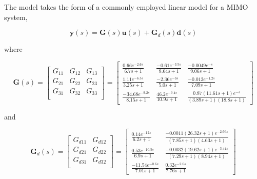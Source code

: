 \documentclass[a4paper,12pt]{article}
\begin{document}
The model takes the form of a commonly employed linear model for a MIMO system,

\begin{equation}
\textbf{y}(s) = \textbf{G}(s)\textbf{u}(s) + \textbf{G}_{d}(s)\textbf{d}(s)
\end{equation}

where

\begin{equation}
	\textbf{G}(s) = \begin{bmatrix}
	G_{11} & G_{12} & G_{13} \\
	G_{21} & G_{22} & G_{23} \\
	G_{31} & G_{32} & G_{33} \\
	\end{bmatrix} = \begin{bmatrix}
	\frac{0.66e^{-2.6s}}{6.7s+1} & \frac{-0.61e^{-3.5s}}{8.64s+1} & \frac{-0.0049e^{-s}}{9.06s+1} \\
	\frac{1.11e^{-6.5s}}{3.25s+1} & \frac{-2.36e^{-3s}}{5.0s+1} & \frac{-0.012e^{-1.2s}}{7.09s+1} \\
	\frac{-34.68e^{-9.2s}}{8.15s+1} & \frac{46.2e^{-9.4s}}{10.9s+1} & \frac{0.87(11.61s+1)e^{-s}}{(3.89s+1)(18.8s+1)}
	\end{bmatrix}
\end{equation}

and

\begin{equation}
\textbf{G}_{d}(s) = \begin{bmatrix}
G_{d11} & G_{d12} \\
G_{d21} & G_{d22} \\
G_{d31} & G_{d32} \\
\end{bmatrix} = \begin{bmatrix}
\frac{0.14e^{-12s}}{6.2s+1} & \frac{-0.0011(26.32s+1)e^{-2.66s}}{(7.85s+1)(4.63s+1)} \\
\frac{0.53e^{-10.5s}}{6.9s+1} & \frac{-0.0032(19.62s+1)e^{-3.44s}}{(7.29s+1)(8.94s+1)} \\
\frac{-11.54e^{-0.6s}}{7.01s+1} & \frac{0.32e^{-2.6s}}{7.76s+1}
\end{bmatrix}
\end{equation}


\appendix
\renewcommand{\thefigure}{\thesection.\arabic{figure}}
\renewcommand{\thetable}{\thesection.\arabic{table}}
\renewcommand{\thepage}{\thesection.\arabic{page}}
\end{document}
